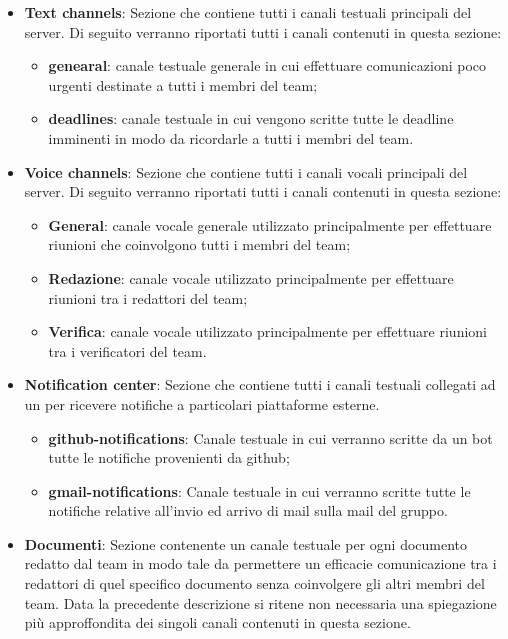  \begin{itemize}
	\item{\textbf{Text channels}: Sezione che contiene tutti i canali testuali principali del server. Di seguito verranno riportati tutti i canali contenuti in questa sezione:
		\begin{itemize}
			\item{\textbf{genearal}: canale testuale generale in cui effettuare comunicazioni poco urgenti destinate a tutti i membri del team;}
			\item{\textbf{deadlines}: canale testuale in cui vengono scritte tutte le deadline imminenti in modo da ricordarle a tutti i membri del team.}
		\end{itemize}
	}
	\item{\textbf{Voice channels}: Sezione che contiene tutti i canali vocali principali del server. Di seguito verranno riportati tutti i canali contenuti in questa sezione:
		\begin{itemize}
			\item{\textbf{General}: canale vocale generale utilizzato principalmente per effettuare riunioni che coinvolgono tutti i membri del team;}
			\item{\textbf{Redazione}: canale vocale utilizzato principalmente per effettuare riunioni tra i redattori del team;}
			\item{\textbf{Verifica}: canale vocale utilizzato principalmente per effettuare riunioni tra i verificatori del team.}
		\end{itemize}
	}
	\item{\textbf{Notification center}: Sezione che contiene tutti i canali testuali collegati ad un  per ricevere notifiche a particolari piattaforme esterne.
		\begin{itemize}
			\item{\textbf{github-notifications}: Canale testuale in cui verranno scritte da un bot tutte le notifiche provenienti da github;}
			\item{\textbf{gmail-notifications}: Canale testuale in cui verranno scritte tutte le notifiche relative all'invio ed arrivo di mail sulla mail del gruppo.}			
		\end{itemize}
	}
	\item{\textbf{Documenti}: Sezione contenente un canale testuale per ogni documento redatto dal team in modo tale da permettere un efficacie comunicazione tra i redattori di quel specifico documento senza coinvolgere gli altri membri del team. Data la precedente descrizione si ritene non necessaria una spiegazione più approffondita dei singoli canali contenuti in questa sezione.}
 \end{itemize}
